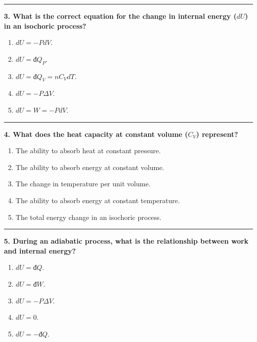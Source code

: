 \documentclass[
  9pt,
]{extbook}
\providecommand{\tightlist}{%
  \setlength{\itemsep}{0pt}\setlength{\parskip}{0pt}}
\theoremstyle{definition}
\theoremstyle{definition}
\theoremstyle{definition}
\theoremstyle{definition}
\theoremstyle{remark}
\begin{document}
\begin{center}\rule{0.5\linewidth}{0.5pt}\end{center}

\textbf{3. What is the correct equation for the change in internal energy (\(dU\)) in an isochoric process?}

\begin{enumerate}
\def\labelenumi{\alph{enumi}.}
\tightlist
\item
  \(dU = -P dV\).
\item
  \(dU = đQ_P\).
\item
  \(dU = đQ_V = nC_V dT\).
\item
  \(dU = -P \Delta V\).
\item
  \(dU = W = -P dV\).
\end{enumerate}

\begin{center}\rule{0.5\linewidth}{0.5pt}\end{center}

\textbf{4. What does the heat capacity at constant volume (\(C_V\)) represent?}

\begin{enumerate}
\def\labelenumi{\alph{enumi}.}
\tightlist
\item
  The ability to absorb heat at constant pressure.
\item
  The ability to absorb energy at constant volume.
\item
  The change in temperature per unit volume.
\item
  The ability to absorb energy at constant temperature.
\item
  The total energy change in an isochoric process.
\end{enumerate}

\begin{center}\rule{0.5\linewidth}{0.5pt}\end{center}

\textbf{5. During an adiabatic process, what is the relationship between work and internal energy?}

\begin{enumerate}
\def\labelenumi{\alph{enumi}.}
\tightlist
\item
  \(dU = đQ\).
\item
  \(dU = đW\).
\item
  \(dU = -P \Delta V\).
\item
  \(dU = 0\).
\item
  \(dU = -đQ\).
\end{enumerate}
\end{document}

